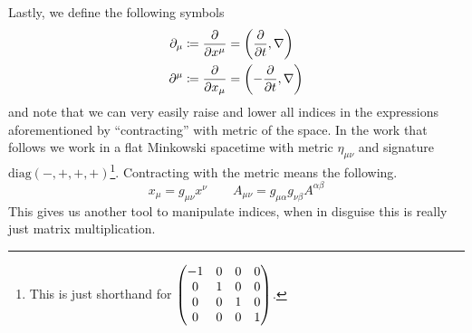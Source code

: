 Lastly, we define the following symbols
\begin{align}\label{eq:partials}
    \begin{split}
        \partial_\mu & \coloneqq\pdv{x^\mu} = \left(\pdv{t}, \nabla\right) \\
        \partial^\mu & \coloneqq\pdv{x_\mu} = \left(-\pdv{t},\nabla\right)
    \end{split}
\end{align}
and note that we can very easily raise and lower all indices in the expressions
aforementioned by ``contracting'' with metric of the space. In the work that
follows we work in a flat Minkowski spacetime with metric \(\eta_{\mu\nu}\) and
signature \(\mathrm{diag}(-,+,+,+)\)\footnote{This is just shorthand for
    \(\mqty(\dmat[0]{-1,1,1,1})\).}. Contracting with the metric means the
following.
\begin{equation}
    x_\mu = g_{\mu\nu}x^\nu \qquad A_{\mu\nu} = g_{\mu\alpha}g_{\nu\beta}A^{\alpha\beta}
\end{equation}
This gives us another tool to manipulate indices, when in disguise this is
really just matrix multiplication.
